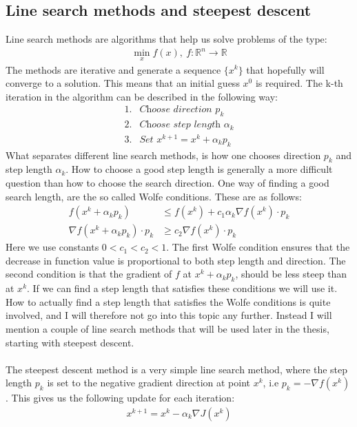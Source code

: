 \subsection{Line search methods and steepest descent}
Line search methods are algorithms that help us solve problems of the type: 
\begin{align*}
\min_x f(x), \ f:\mathbb{R}^n\longrightarrow\mathbb{R}
\end{align*}
The methods are iterative and generate a sequence $\{x^k\}$ that hopefully will converge to a solution. This means that an initial guess $x^0$ is required. The k-th iteration in the algorithm can be described in the following way:
\begin{align*}
1. &\textit{Choose direction $p_k$} \\
2. &\textit{Choose step length $\alpha_k$} \\
3. &\textit{Set $x^{k+1}=x^k + \alpha_kp_k$} 
\end{align*}
What separates different line search methods, is how one chooses direction $p_k$ and step length $\alpha_k$. How to choose a good step length is generally a more difficult question than how to choose the search direction. One way of finding a good search length, are the so called Wolfe conditions. These are as follows:
\begin{align*}
f(x^k + \alpha_kp_k)&\leq f(x^k) + c_1\alpha_k\nabla f(x^k)\cdot p_k \\
\nabla f(x^k + \alpha_kp_k) \cdot p_k &\geq c_2 \nabla f(x^k)\cdot p_k
\end{align*}
Here we use constants $0<c_1<c_2<1$. The first Wolfe condition ensures that the decrease in function value is proportional to both step length and direction. The second condition is that the gradient of $f$ at $x^k + \alpha_kp_k$, should be less steep than at $x^k$. If we can find a step length that satisfies these conditions we will use it. How to actually find a step length that satisfies the Wolfe conditions is quite involved, and I will therefore not go into this topic any further. Instead I will mention a couple of line search methods that will be used later in the thesis, starting with steepest descent.
\\
\\
The steepest descent method is a very simple line search method, where the step length $p_k$ is set to the negative gradient direction at point $x^k$, i.e $p_k = -\nabla f(x^k)$. This gives us the following update for each iteration:
\begin{align*}
x^{k+1} = x^k - \alpha_k \nabla J(x^k)
\end{align*} 
